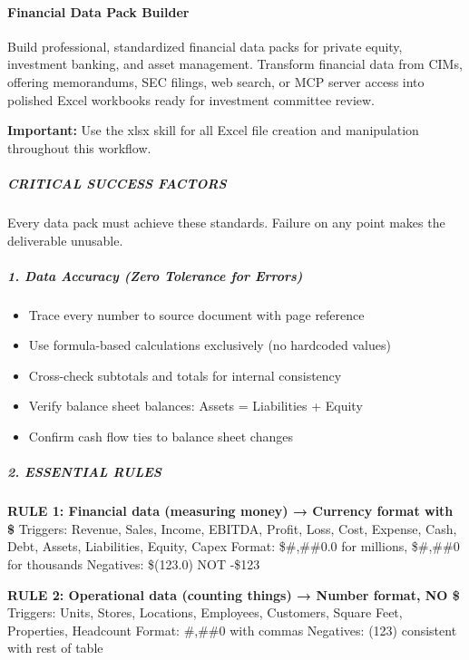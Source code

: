 \documentclass[11pt]{article}
\begin{document}
\paragraph{Financial Data Pack Builder}\mbox{}\par

Build professional, standardized financial data packs for private equity, investment banking, and asset management. Transform financial data from CIMs, offering memorandums, SEC filings, web search, or MCP server access into polished Excel workbooks ready for investment committee review.


\textbf{Important:} Use the xlsx skill for all Excel file creation and manipulation throughout this workflow.


\subparagraph{CRITICAL SUCCESS FACTORS}\mbox{}\par

Every data pack must achieve these standards. Failure on any point makes the deliverable unusable.


\subparagraph{1. Data Accuracy (Zero Tolerance for Errors)}\mbox{}\par
\begin{itemize}[leftmargin=*,itemsep=2pt,topsep=2pt]
\item {} Trace every number to source document with page reference
\item {} Use formula-based calculations exclusively (no hardcoded values)
\item {} Cross-check subtotals and totals for internal consistency
\item {} Verify balance sheet balances: Assets = Liabilities + Equity
\item {} Confirm cash flow ties to balance sheet changes
\end{itemize}

\subparagraph{2. ESSENTIAL RULES}\mbox{}\par

\textbf{RULE 1: Financial data (measuring money) → Currency format with \$} Triggers: Revenue, Sales, Income, EBITDA, Profit, Loss, Cost, Expense, Cash, Debt, Assets, Liabilities, Equity, Capex Format: \$\#,\#\#0.0 for millions, \$\#,\#\#0 for thousands Negatives: \$(123.0) NOT -\$123


\textbf{RULE 2: Operational data (counting things) → Number format, NO \$} Triggers: Units, Stores, Locations, Employees, Customers, Square Feet, Properties, Headcount Format: \#,\#\#0 with commas Negatives: (123) consistent with rest of table
\end{document}
